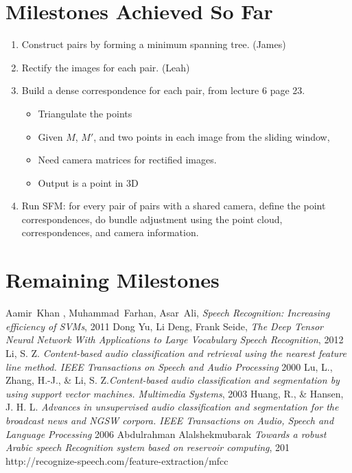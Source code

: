 \documentclass[journal]{IEEEtran}
\begin{document}
\section{Milestones Achieved So Far} \label{achieved}
\begin{enumerate}
  \item Construct pairs by forming a minimum spanning tree. (James)
  \item Rectify the images for each pair. (Leah)
  \item Build a dense correspondence for each pair, from lecture 6 page 23.
  \begin{itemize}
    \item Triangulate the points
    \item Given $M$, $M'$, and two points in each image from the sliding window,
    \item Need camera matrices for rectified images.
    \item Output is a point in 3D
  \end{itemize}
  \item Run SFM: for every pair of pairs with a shared camera, define the point correspondences, do bundle adjustment using the point cloud, correspondences, and camera information.

\end{enumerate}


\section{Remaining Milestones} \label{remaining}

\ifCLASSOPTIONcaptionsoff
  \newpage
\fi
\begin{thebibliography}{1}

Aamir~Khan , Muhammad~Farhan, Asar~Ali, \emph{Speech Recognition: Increasing efficiency of SVMs}, 2011
\bibitem{}
Dong Yu, Li Deng, Frank Seide, \emph{The Deep Tensor Neural Network With Applications to Large Vocabulary Speech Recognition}, 2012
\bibitem{}
Li, S. Z. \emph{Content-based audio classification and retrieval using the nearest feature line method. IEEE Transactions on Speech and Audio Processing} 2000
\bibitem{}
Lu, L., Zhang, H.-J., \& Li, S. Z.\emph{Content-based audio classification and segmentation by using support vector machines. Multimedia Systems}, 2003
\bibitem{}
Huang, R., \& Hansen, J. H. L. \emph{Advances in unsupervised audio classification and segmentation for the broadcast news and NGSW corpora. IEEE Transactions on Audio, Speech and Language Processing} 2006
\bibitem{}
Abdulrahman Alalshekmubarak \emph{Towards a robust Arabic speech Recognition system based on reservoir computing}, 201
\bibitem{}
http://recognize-speech.com/feature-extraction/mfcc
\end{thebibliography}
\end{document}
